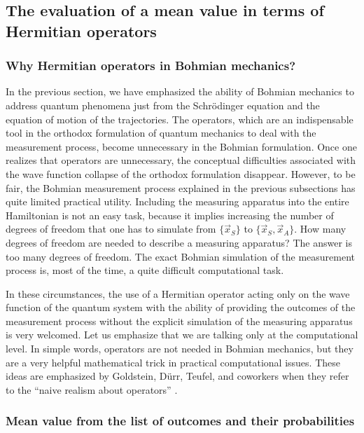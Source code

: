 \documentclass[onecolumn,nofootinbib, secnumarabic, amsmath, nobibnotes,12pt,aps,pra]{revtex4-1}
\begin{document}
\subsection{The evaluation of a mean value in terms of Hermitian operators}
\label{om.sec_measurement.2}


\subsubsection{Why Hermitian operators in Bohmian mechanics?}

In the previous section, we have emphasized the ability of Bohmian
mechanics to address quantum phenomena just from the
Schr\"odinger equation and the equation of motion of the
trajectories. The operators, which are an indispensable tool in the
orthodox formulation of quantum mechanics to deal with  the measurement
process, become unnecessary in the Bohmian formulation. Once one
realizes that operators are unnecessary, the conceptual difficulties
associated with the wave function collapse of the orthodox
formulation disappear. However, to be fair, the Bohmian measurement
process explained in the previous subsections has quite limited
practical utility. Including the measuring apparatus into the entire
Hamiltonian is not an easy task, because it implies increasing the
number of degrees of freedom that one has to simulate from $\{\vec
x_S\}$ to $\{\vec x_S,\vec x_A\}$. How many degrees of freedom are
needed to describe a measuring apparatus? The answer is too many
degrees of freedom. The exact Bohmian simulation of the measurement
process is, most of the time, a quite difficult computational task.

In these circumstances, the use of a Hermitian operator acting only
on the wave function of the quantum system with the ability of
providing the outcomes of the measurement process without the
explicit simulation of the measuring apparatus is very welcomed. Let
us emphasize that we are talking only at the computational level. In
simple words, operators are not needed in Bohmian mechanics, but
they are a very helpful mathematical trick in practical
computational issues. These ideas are emphasized by Goldstein,
D\"{u}rr, Teufel, and coworkers when they refer to the ``naive
realism about operators'' \cite{om.Durrnaive,om.Durrllibre,om.goldstein}.


\subsubsection{Mean value from the list of outcomes and their probabilities}
\end{document}
